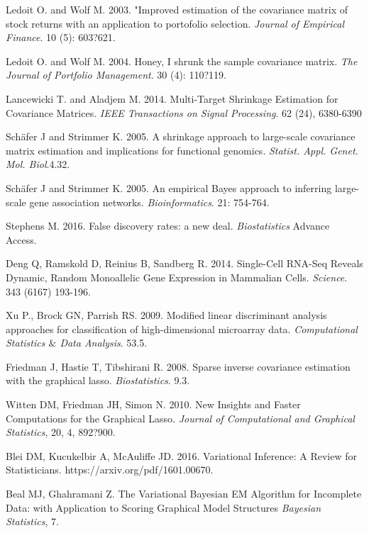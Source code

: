 \begin{thebibliography}{9}

Ledoit O. and Wolf  M. 2003. 
"Improved estimation of the covariance matrix of stock returns with an application to portofolio selection.
\textit{Journal of Empirical Finance}. 10 (5): 603?621.

Ledoit O. and Wolf  M. 2004. 
Honey, I shrunk the sample covariance matrix.
\textit{The Journal of Portfolio Management}. 30 (4): 110?119.

Lancewicki T. and Aladjem M. 2014.
Multi-Target Shrinkage Estimation for Covariance Matrices.
\textit{IEEE Transactions on Signal Processing}. 62 (24), 6380-6390

Sch\"{a}fer J and Strimmer K.  2005. 
A shrinkage approach to large-scale covariance matrix estimation and implications for functional genomics. 
\textit{Statist. Appl. Genet. Mol. Biol}.4.32.

Sch\"{a}fer J and Strimmer K.  2005. 
An empirical Bayes approach to inferring large-scale gene association networks. 
\textit{Bioinformatics}. 21: 754-764.

Stephens M. 2016. 
False discovery rates: a new deal. 
\textit{Biostatistics} Advance Access.


Deng Q,  Ramskold D,  Reinius B,  Sandberg R. 2014.
Single-Cell RNA-Seq Reveals Dynamic, Random Monoallelic Gene Expression in Mammalian Cells.
\textit{Science}.  343 (6167) 193-196.

Xu P.,  Brock GN,  Parrish RS.  2009.
Modified linear discriminant analysis approaches for classification of high-dimensional microarray data.
\textit{Computational Statistics $\&$ Data Analysis}. 53.5.

Friedman J,  Hastie T,  Tibshirani R. 2008.
Sparse inverse covariance estimation with the graphical lasso. 
\textit{Biostatistics}. 9.3.

Witten DM,  Friedman JH, Simon N. 2010.
New Insights and Faster Computations for the Graphical Lasso. 
\textit{Journal of Computational and Graphical Statistics}, 20, 4, 892?900.

Blei DM, Kucukelbir A, McAuliffe JD. 2016.
Variational Inference: A Review for Statisticians.
https://arxiv.org/pdf/1601.00670.

Beal MJ, Ghahramani Z.
The Variational Bayesian EM Algorithm for Incomplete Data: with Application to Scoring Graphical Model Structures
\textit{Bayesian Statistics}, 7.


\end{thebibliography}



